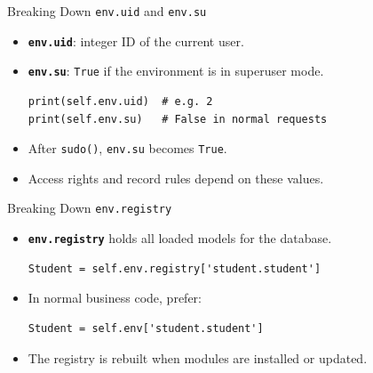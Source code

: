 \begin{frame}[fragile]{Breaking Down \texttt{env.uid} and \texttt{env.su}}
	\begin{itemize}
		\item \textbf{\texttt{env.uid}}: integer ID of the current user.
		\item \textbf{\texttt{env.su}}: \texttt{True} if the environment is in superuser mode.
\begin{lstlisting}
print(self.env.uid)  # e.g. 2
print(self.env.su)   # False in normal requests
\end{lstlisting}
		\item After \texttt{sudo()}, \texttt{env.su} becomes \texttt{True}.
		\item Access rights and record rules depend on these values.
	\end{itemize}
\end{frame}

\begin{frame}[fragile]{Breaking Down \texttt{env.registry}}
	\begin{itemize}
		\item \textbf{\texttt{env.registry}} holds all loaded models for the database.
\begin{lstlisting}
Student = self.env.registry['student.student']
\end{lstlisting}
		\item In normal business code, prefer:
\begin{lstlisting}
Student = self.env['student.student']
\end{lstlisting}
		\item The registry is rebuilt when modules are installed or updated.
	\end{itemize}
\end{frame}
